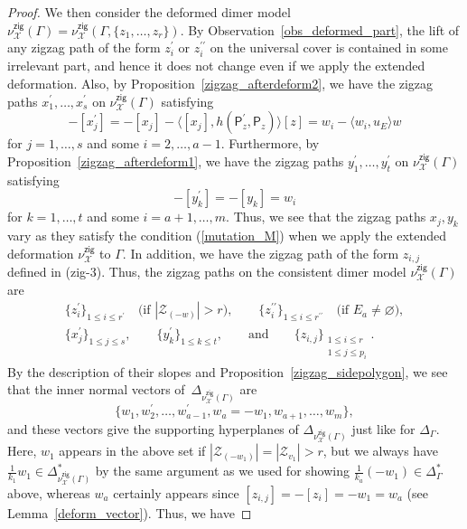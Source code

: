 \documentclass[pdftex]{sigma}%
\numberwithin{equation}{section}
\numberwithin{figure}{section}
\numberwithin{table}{section}
\newcommand{\calX}{\mathcal{X}}
\newcommand{\calZ}{\mathcal{Z}}
\newcommand{\sfP}{\mathsf{P}}
\newcommand{\zig}{\mathsf{zig}}
\begin{document}
\begin{proof}
We then consider the deformed dimer model $\nu^\zig_\calX(\Gamma)=\nu^\zig_\calX(\Gamma,\{z_1,\dots,z_r\})$.
By Observation~\ref{obs_deformed_part}, the lift of any zigzag path of the form $z_i^\prime$ or $z_i^{\prime\prime}$ on the universal cover is contained in some irrelevant part, and hence it does not change even if we apply the extended deformation.
Also, by Proposition~\ref{zigzag_afterdeform2}, we have the zigzag paths $x_1^\prime,\dots,x_s^\prime$ on $\nu^\zig_\calX(\Gamma)$ satisfying
\begin{displaymath}
-[x^{\prime}_j]=-[x_j]-\langle [x_j],h(\sfP_z^\prime,\sfP_z)\rangle[z]=w_i-\langle w_i,u_E\rangle w
\end{displaymath}
for $j=1,\dots,s$ and some $i=2,\dots,a-1$.
Furthermore, by Proposition~\ref{zigzag_afterdeform1}, we have the zigzag paths $y_1^\prime,\dots,y_t^\prime$ on $\nu^\zig_\calX(\Gamma)$ satisfying
\begin{displaymath}
-[y_k^\prime]=-[y_k]=w_i
\end{displaymath}
for $k=1,\dots,t$ and some $i=a+1,\dots,m$.
Thus, we see that the zigzag paths $x_j, y_k$ vary as they satisfy the condition (\ref{mutation_M}) when we apply the extended deformation $\nu^\zig_\calX$ to $\Gamma$.
In addition, we have the zigzag path of the form $z_{i,j}$ defined in (zig-3).
Thus, the zigzag paths on the consistent dimer model $\nu^\zig_\calX(\Gamma)$ are
\begin{gather*}
\{z_i^\prime\}_{1\le i\le r^\prime}\quad \text{(if $|\calZ_{(-w)}|>r$)},\qquad \{z_i^{\prime\prime}\}_{1\le i\le r^{\prime\prime}}\quad \text{(if $E_a\neq\varnothing$)},\\
\{x_j^\prime\}_{1\le j\le s},\qquad \{y_k^\prime\}_{1\le k\le t},\qquad \text{and} \qquad \{z_{i,j}\}_{\substack{1\le i\le r \\ 1\le j\le p_i}}.
\end{gather*}
By the description of their slopes and Proposition~\ref{zigzag_sidepolygon}, we see that the inner normal vectors of~$\Delta_{\nu^\zig_\calX(\Gamma)}$ are
\begin{displaymath}
\{w_1,w_2^\prime,\dots,w_{a-1}^\prime,w_a=-w_1, w_{a+1}, \dots,w_m\},
\end{displaymath}
and these vectors give the supporting hyperplanes of $\Delta_{\nu^\zig_\calX(\Gamma)}$ just like for $\Delta_\Gamma$.
Here, $w_1$ appears in the above set if $|\calZ_{(-w_1)}|=|\calZ_{v_1}|>r$,
but we always have $\frac{1}{k_1}w_1\in \Delta_{\nu^\zig_\calX(\Gamma)}^*$ by the same argument as we used for showing $\frac{1}{k_a}(-w_1)\in\Delta_\Gamma^*$ above, whereas $w_a$ certainly appears since $[z_{i,j}]=-[z_i]=-w_1=w_a$ (see Lemma~\ref{deform_vector}). Thus, we have

\end{proof}
\end{document}
